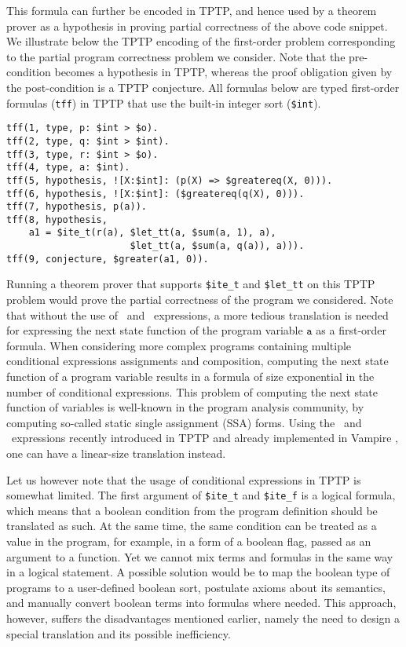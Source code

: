 This formula can further be encoded in TPTP, and hence used by a theorem prover as a hypothesis in proving partial correctness of the above code snippet. We illustrate below the TPTP encoding of the first-order problem corresponding to the partial program correctness problem we consider.  Note that the pre-condition becomes a hypothesis in TPTP, whereas the proof obligation given by the post-condition is a TPTP conjecture. All formulas below are typed first-order formulas (\lstinline'tff') in TPTP that use the built-in integer sort (\lstinline'$int').
\begin{lstlisting}[language=tptp]
tff(1, type, p: $int > $o).
tff(2, type, q: $int > $int).
tff(3, type, r: $int > $o).
tff(4, type, a: $int).
tff(5, hypothesis, ![X:$int]: (p(X) => $greatereq(X, 0))).
tff(6, hypothesis, ![X:$int]: ($greatereq(q(X), 0))).
tff(7, hypothesis, p(a)).
tff(8, hypothesis,
    a1 = $ite_t(r(a), $let_tt(a, $sum(a, 1), a),
                      $let_tt(a, $sum(a, q(a)), a))).
tff(9, conjecture, $greater(a1, 0)).
\end{lstlisting}

Running a theorem prover that supports \lstinline'$ite_t' and \lstinline'$let_tt' on this TPTP problem would prove the partial correctness of the program we considered. Note that without the use of \ITE\ and \LETIN\ expressions, a more tedious translation is needed for expressing the next state function of the program variable $\mathtt{a}$ as a first-order formula. When considering more complex programs containing multiple conditional expressions assignments and composition,
computing the next state function of a program variable results in a formula of size exponential in the number of conditional expressions. This problem of computing the next state function of variables is well-known in the program analysis community, by computing so-called static single assignment (SSA) forms. Using the \ITE\ and \LETIN\ expressions recently introduced in TPTP and already implemented in Vampire \cite{PSI14}, one can have a linear-size translation instead.

Let us however note that the usage of conditional expressions in TPTP is somewhat limited. The first argument of \lstinline'$ite_t' and \lstinline'$ite_f' is a logical formula, which means that a boolean condition from the program definition should be translated as such. At the same time, the same condition can be treated as a value in the program, for example, in a form of a boolean flag, passed as an argument to a function. Yet we cannot mix terms and formulas in the same way in a logical statement.
A possible solution would be to map the boolean type of programs to a user-defined boolean sort, postulate axioms about its semantics, and manually convert boolean terms into formulas where needed. This approach, however, suffers the disadvantages mentioned earlier, namely the need to design a special translation and its possible inefficiency.

